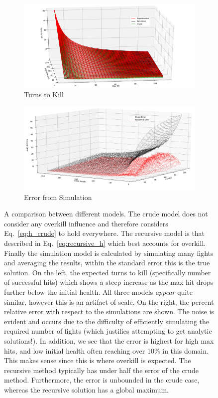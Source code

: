 \documentclass[../../main.tex]{subfiles}
\begin{document}
				\begin{figure}
					\centering
					\begin{subfigure}{.5\textwidth}
						\centering
						\includegraphics[width=\linewidth]{img/h2k_h2.png}
						\caption{Turns to Kill}
					\end{subfigure}%
					\begin{subfigure}{.5\textwidth}
						\centering
						\includegraphics[width=\linewidth]{img/h2k_e2.png}
						\caption{Error from Simulation}
					\end{subfigure}
					\caption{A comparison between different models. The crude model does not consider any overkill influence and therefore considers Eq.~\ref{eq:h_crude} to hold everywhere. The recursive model is that described in Eq.~\ref{eq:recursive_h} which best accounts for overkill. Finally the simulation model is calculated by simulating many fights and averaging the results, within the standard error this is the true solution. On the left, the expected turns to kill (specifically number of successful hits) which shows a steep increase as the max hit drops further below the initial health. All three models \textit{appear} quite similar, however this is an artifact of scale. On the right, the percent relative error with respect to the simulations are shown. The noise is evident and occurs due to the difficulty of efficiently simulating the required number of fights (which justifies attempting to get analytic solutions!). In addition, we see that the error is highest for high max hits, and low initial health often reaching over 10\% in this domain. This makes sense since this is where overkill is expected. The recursive method typically has under half the error of the crude method. Furthermore, the error is unbounded in the crude case, whereas the recursive solution has a global maximum.}
					\label{fig:comparison}
				\end{figure}
\end{document}
